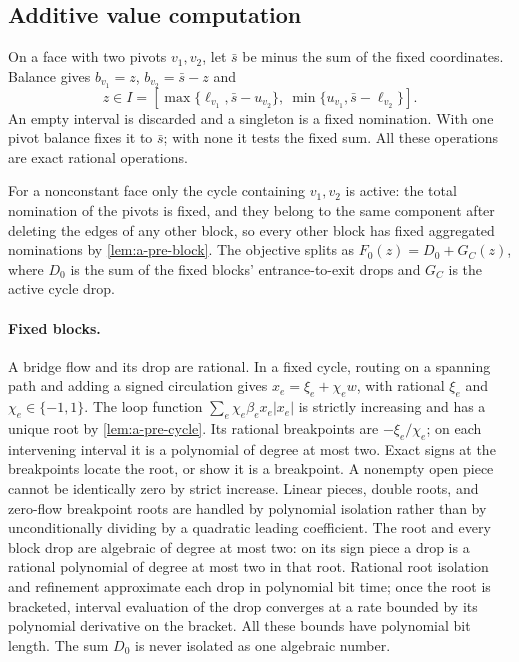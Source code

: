 \subsection{Additive value computation}
\label{subsec:a-cac-algorithm}
On a face with two pivots $v_1,v_2$, let $\bar s$ be minus the sum of the fixed
coordinates. Balance gives $b_{v_1}=z$, $b_{v_2}=\bar s-z$ and
\begin{equation}
 z\in I=[\max\{\ell_{v_1},\bar s-u_{v_2}\},\ \min\{u_{v_1},\bar s-\ell_{v_2}\}].
 \label{eq:a-cac-parameter}
\end{equation}
An empty interval is discarded and a singleton is a fixed nomination.
With one pivot balance fixes it to $\bar s$; with none it tests the fixed
sum. All these operations are exact rational operations.

For a nonconstant face only the cycle containing $v_1,v_2$ is active:
the total nomination of the pivots is fixed, and they belong to the
same component after deleting the edges of any other block, so every
other block has fixed aggregated nominations by \cref{lem:a-pre-block}.
The objective splits as $F_0(z)=D_0+G_C(z)$, where $D_0$ is the sum of the
fixed blocks' entrance-to-exit drops and $G_C$ is the active cycle drop.

\paragraph{Fixed blocks.}
A bridge flow and its drop are rational. In a fixed cycle, routing on
a spanning path and adding a signed circulation gives
$x_e=\xi_e+\chi_e w$, with rational $\xi_e$ and $\chi_e\in\{-1,1\}$.
The loop function $\sum_e\chi_e\beta_ex_e|x_e|$ is strictly increasing
and has a unique root by \cref{lem:a-pre-cycle}. Its rational breakpoints
are $-\xi_e/\chi_e$; on each intervening interval it is a polynomial
of degree at most two. Exact signs at the breakpoints locate the root,
or show it is a breakpoint. A nonempty open piece cannot be identically
zero by strict increase. Linear pieces, double roots, and zero-flow
breakpoint roots are handled by polynomial isolation rather than by
unconditionally dividing by a quadratic leading coefficient. The root
and every block drop are algebraic of degree at most two: on its sign
piece a drop is a rational polynomial of degree at most two in that
root. Rational root isolation and refinement
\citep[Chapter 10]{basu2006-algorithms-in-real-algebraic-geometry}
approximate each drop in polynomial bit time; once the root is
bracketed, interval evaluation of the drop converges at a rate bounded
by its polynomial derivative on the bracket. All these bounds have
polynomial bit length. The sum $D_0$ is never isolated as one algebraic
number.


